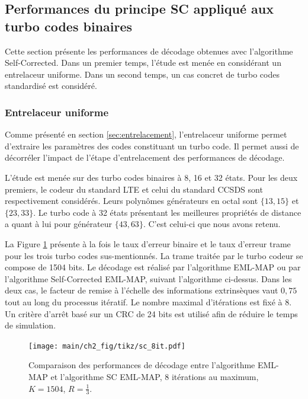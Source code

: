 \subsection{Performances du principe SC appliqué aux turbo codes binaires}
Cette section présente les performances de décodage obtenues avec l'algorithme Self-Corrected. Dans un premier temps, 
l'étude est menée en considérant un entrelaceur uniforme. Dans un second temps, un cas concret de turbo codes standardisé est considéré.
\subsubsection{Entrelaceur uniforme}
Comme présenté en section \ref{sec:entrelacement}, l'entrelaceur uniforme permet d'extraire les paramètres des codes 
constituant un turbo code. Il permet aussi de décorréler l'impact de l'étape d'entrelacement des performances de 
décodage. 

L'étude est menée sur des turbo codes binaires à 8, 16 et 32 états. Pour les deux premiers, le codeur du standard LTE
et celui du standard CCSDS sont respectivement considérés. Leurs polynômes générateurs en octal sont $\{13,15\}$ et $\{23,33\}$. Le 
turbo code à 32 états présentant les meilleures propriétés de distance a quant à lui pour générateur $\{43,63\}$. C'est 
celui-ci que nous avons retenu.

La Figure \ref{fig:sc8it} présente à la fois le taux d'erreur binaire et le taux d'erreur trame pour les trois turbo 
codes sus-mentionnés. La trame traitée par le turbo codeur se compose de 1504 bits. Le décodage est réalisé par
l'algorithme EML-MAP ou par l’algorithme Self-Corrected EML-MAP, suivant l'algorithme ci-dessus.
Dans les deux cas, le facteur de remise à l'échelle des informations extrinsèques vaut $0,75$ tout au long du processus itératif.
Le nombre maximal d'itérations est fixé à 8. Un critère d'arrêt basé sur un CRC de 24 bits est utilisé afin de réduire le
temps de simulation.

\begin{figure}[!ht]
	\vspace*{-.2cm}
	\centering
	\texttt{[image: main/ch2\_fig/tikz/sc\_8it.pdf]}
	\vspace*{-.1cm}
	\caption{Comparaison des performances de décodage entre l'algorithme EML-MAP et l'algorithme SC EML-MAP, 8 itérations au maximum, $K=1504$, $R=\frac{1}{3}$. \label{fig:sc8it}}
	\vspace*{-.1cm}
\end{figure}

